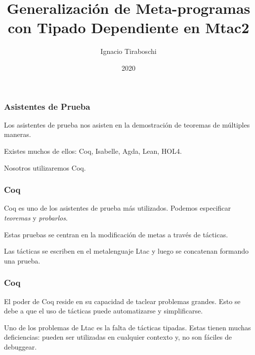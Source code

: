 \documentclass{beamer}
\title{Generalización de Meta-programas con Tipado Dependiente en Mtac2}
\author{Ignacio Tiraboschi}
\institute{Universidad Nacional de Córdoba - FAMAF}
\date{2020}
\begin{document}
\frame{\titlepage}

\begin{frame}
\frametitle{Asistentes de Prueba}

Los asistentes de prueba nos asisten en la demostración de teoremas de múltiples maneras.
\vspace{\baselineskip}

Existes muchos de ellos: Coq, Isabelle, Agda, Lean, HOL4.
\vspace{\baselineskip}

Nosotros utilizaremos Coq.

\end{frame}

\begin{frame}
\frametitle{Coq}
Coq es uno de los asistentes de prueba más utilizados.
Podemos especificar \emph{teoremas} y \emph{probarlos}.
\vspace{\baselineskip}

Estas pruebas se centran en la modificación de metas a través de tácticas.
\vspace{\baselineskip}

Las tácticas se escriben en el metalenguaje Ltac y luego se concatenan formando una prueba.
\end{frame}


\begin{frame}
\frametitle{Coq}

El poder de Coq reside en su capacidad de taclear problemas grandes.
Esto se debe a que el uso de tácticas puede automatizarse y simplificarse.
\vspace{\baselineskip}

\pause
Uno de los problemas de Ltac es la falta de tácticas tipadas.
Estas tienen muchas deficiencias: pueden ser utilizadas en cualquier contexto y, no son fáciles de debuggear.
\end{frame}
\end{document}
